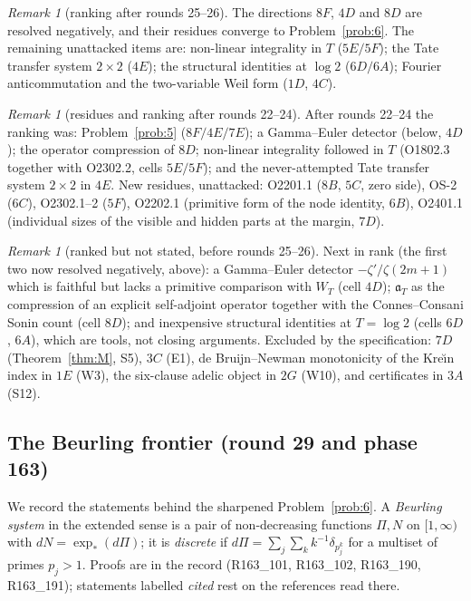 \documentclass[11pt]{amsart}
\theoremstyle{definition}
\theoremstyle{remark}
\newtheorem{remark}[theorem]{Remark}
\begin{document}
\begin{remark}[ranking after rounds 25--26]
The directions $8F$, $4D$ and $8D$ are resolved negatively, and their residues converge to Problem~\ref{prob:6}.
The remaining unattacked items are: non-linear integrality in $T$ ($5E/5F$); the Tate transfer system $2\times2$ ($4E$);
the structural identities at $\log2$ ($6D/6A$); Fourier anticommutation and the two-variable Weil form ($1D$, $4C$).
\end{remark}

\begin{remark}[residues and ranking after rounds 22--24]
After rounds 22--24 the ranking was: Problem~\ref{prob:5} ($8F/4E/7E$); a Gamma--Euler detector (below, $4D$);
the operator compression of $8D$; non-linear integrality followed in $T$ (O1802.3 together with O2302.2, cells
$5E/5F$); and the never-attempted Tate transfer system $2\times2$ in $4E$. New residues, unattacked:
O2201.1 ($8B$, $5C$, zero side), OS-2 ($6C$), O2302.1--2 ($5F$), O2202.1 (primitive form of the node
identity, $6B$), O2401.1 (individual sizes of the visible and hidden parts at the margin, $7D$).
\end{remark}

\begin{remark}[ranked but not stated, before rounds 25--26]
Next in rank (the first two now resolved negatively, above): a Gamma--Euler detector $-\zeta'/\zeta(2m+1)$ which is faithful but lacks a primitive
comparison with $W_T$ (cell $4D$); $\mathfrak a_T$ as the compression of an explicit self-adjoint operator
together with the Connes--Consani Sonin count (cell $8D$); and inexpensive structural identities at
$T=\log2$ (cells $6D$, $6A$), which are tools, not closing arguments. Excluded by the specification:
$7D$ (Theorem~\ref{thm:M}, S5), $3C$ (E1), de Bruijn--Newman monotonicity of the Kre\u{\i}n index in $1E$
(W3), the six-clause adelic object in $2G$ (W10), and certificates in $3A$ (S12).
\end{remark}

\subsection{The Beurling frontier (round 29 and phase 163)}\label{subsec:beurling}
We record the statements behind the sharpened Problem~\ref{prob:6}. A \emph{Beurling system} in the extended
sense is a pair of non-decreasing functions $\Pi,N$ on $[1,\infty)$ with $dN=\exp_*(d\Pi)$; it is \emph{discrete} if
$d\Pi=\sum_j\sum_k k^{-1}\delta_{p_j^k}$ for a multiset of primes $p_j>1$. Proofs are in the record (R163\_101,
R163\_102, R163\_190, R163\_191); statements labelled \emph{cited} rest on the references read there.
\end{document}
